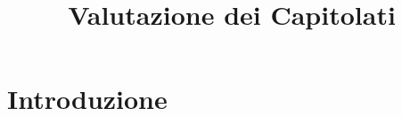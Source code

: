 \documentclass{classes/base}
\title{Valutazione dei Capitolati}
\author{\matteo}
\begin{document}
	\maketitle
	\newpage
	\tableofcontents
	
	\newpage
	\section{Introduzione}
	
	
\end{document}
